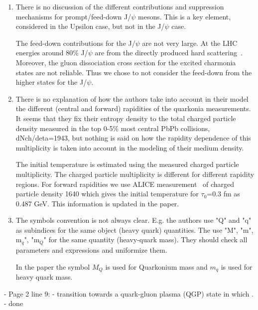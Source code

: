 \documentclass[a4paper,11pt]{article}
\begin{document}
\begin{enumerate}

\item There is no discussion of the different contributions and suppression 
mechanisms for prompt/feed-down J/$\psi$ mesons. This is a key element, considered 
in the Upsilon case, but not in the J/$\psi$ case.

{\color{red} The feed-down contributions for the J/$\psi$ are not very large.
  At the LHC energies around 80\% J/$\psi$ are from the directly produced hard
  scattering~\cite{Lansberg:2019adr}. Moreover, the gluon dissociation cross section for
  the excited charmonia states are not reliable. Thus we chose to not consider the feed-down
  from the higher states for the J/$\psi$. 
} 

\item There is no explanation of how the authors take into account in their model 
the different (central and forward) rapidities of the quarkonia measurements. 
It seems that they fix their entropy density to the total charged particle density 
measured in the top 0-5$\%$ most central PbPb collisions, dNch/deta=1943, but 
nothing is said on how the rapidity dependence of this multiplicity is 
taken into account in the modeling of their medium density. 

{ \color{blue} The initial temperature is estimated using the measured charged particle
  multiplicity. The charged particle multiplicity is different for different
  rapidity regions. For forward rapidities we use ALICE measurement~\cite{Adam:2016ddh}
  of charged particle density 1640 which gives the initial temperature for $\tau_0$=0.3 fm
  as 0.487 GeV. This information is updated in the paper.
}







\item The symbols convention is not always clear. E.g. the authors use "Q" and 
"q" as subindices for the same object (heavy quark) quantities. The use "M", 
"m", m$_q$", "m$_Q$" for the same quantity (heavy-quark mass). They should check 
all parameters and expressions and uniformize them. 

{ \color{blue} In the paper the symbol $M_Q$ is used for Quarkonium mass and $m_q$ is used for
  heavy quark mass.}

\end{enumerate}


- Page 2 line 9: - transition towards a quark-gluon plasma (QGP) state in which . \newline 
- {\color{blue} done} \newline
\end{document}
